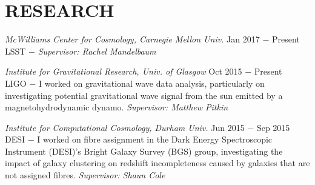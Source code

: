 \section{RESEARCH}

{\sl McWilliams Center for Cosmology, Carnegie Mellon Univ.} \hfill Jan 2017 $-$ Present \\

\hspace{3 mm} LSST $-$
\emph{Supervisor: Rachel Mandelbaum}


{\sl Institute for Gravitational Research, Univ. of Glasgow} \hfill Oct 2015 $-$ Present \\

\hspace{3 mm} LIGO $-$ I worked on gravitational wave data analysis, particularly on investigating potential gravitational wave signal from the sun emitted by a magnetohydrodynamic dynamo. \emph{Supervisor: Matthew Pitkin}


{\sl Institute for Computational Cosmology, Durham Univ.} \hfill Jun 2015 $-$ Sep 2015 \\

\hspace{3 mm} DESI $-$ I worked on fibre assignment in the Dark Energy Spectroscopic Instrument (DESI)'s Bright Galaxy Survey (BGS) group, investigating the impact of galaxy clustering on redshift incompleteness caused by galaxies that are not assigned fibres. \emph{Supervisor: Shaun Cole}
 
